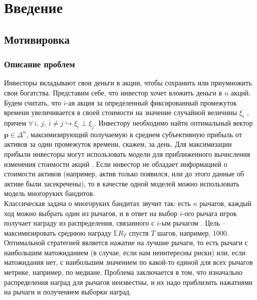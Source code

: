 
\chapter{Введение} %

\label{Introduction} %

\newcommand{\tbf}[1]{\textbf{#1}}
\newcommand{\hook}{\hookrightarrow}
\newcommand{\bb}[1]{\mathbb{#1}}


\section{Мотивировка}

\subsection{Описание проблем}
\label{sec:problem_description}

Инвесторы вкладывают свои деньги в акции, чтобы сохранить или приумножить свои богатства. Представим себе, что инвестор хочет вложить деньги в $n$ акций. Будем считать, что $i$-ая акция за определенный фиксированный промежуток времени увеличивается в своей стоимости на значение случайной величины $\xi_i$ , причем $\forall \, i, \, j, \: i \neq j \hook \xi_i \perp \xi_j$. Инвестору необходимо найти оптимальный вектор $\tbf{p} \in \Delta^n$, максимизирующий получаемую в среднем субъективную прибыль от активов за один промежуток времени, скажем, за день. Для максимизации прибыли инвесторы могут использовать модели для приближенного вычисления изменения стоимости акций \cite{bouchaudpotters}. Если инвестор не обладает информацией о стоимости активов (например, актив только появился, или до этого данные об активе были засекречены), то в качестве одной моделей можно использовать модель многоруких бандитов. \\

Классическая задача о многоруких бандитах звучит так: есть $n$ рычагов, каждый ход можно выбрать один из рычагов, и в ответ на выбор $i$-ого рычага игрок получает награду из распределения, связанного с $i$-ым рычагом \cite{suttonbarto}. Цель -- максимизировать среднюю награду $\bb{E} R_T$ спустя $T$ шагов, например, 1000. Оптимальной стратегией является нажатие на лучшие рычаги, то есть рычаги с наибольшим матожиданием (в случае, если нам неинтересны риски) или, если матожидания нет, с наибольшим значением по какой-то единой для всех рычагов метрике, например, по медиане. Проблема заключается в том, что изначально распределения наград для рычагов неизвестны, и их надо приблизить нажатиями на рычаги и получением выборки наград. \\

